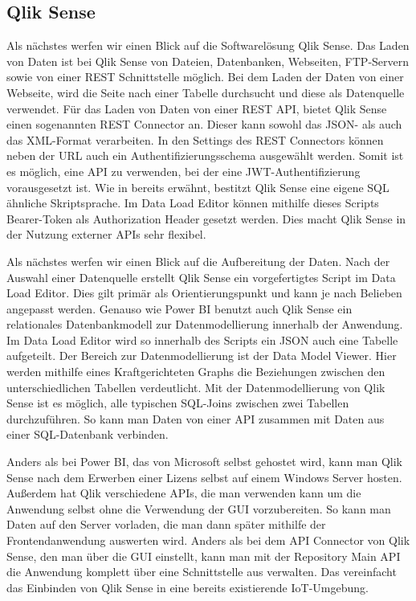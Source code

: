 \subsection{Qlik Sense}
\label{subsec:qliksense}
Als nächstes werfen wir einen Blick auf die Softwarelösung Qlik Sense.
Das Laden von Daten ist bei Qlik Sense von Dateien, Datenbanken, Webseiten, FTP-Servern sowie von einer
REST Schnittstelle möglich. Bei dem Laden der Daten von einer Webseite, wird die Seite nach einer Tabelle
durchsucht und diese als Datenquelle verwendet.\cite[S. 17]{QlikSenseCookbook} Für das Laden von Daten von
einer REST API, bietet Qlik Sense einen sogenannten REST Connector an. Dieser kann sowohl das JSON- als auch
das XML-Format verarbeiten. In den Settings des REST Connectors können neben der URL auch ein
Authentifizierungsschema ausgewählt werden.\cite[S. 23]{QlikSenseCookbook} Somit ist es möglich,
eine API zu verwenden, bei der eine JWT-Authentifizierung vorausgesetzt ist. Wie in 
bereits erwähnt, bestitzt Qlik Sense eine eigene SQL ähnliche Skriptsprache. Im Data Load Editor
können mithilfe dieses Scripts Bearer-Token als Authorization Header gesetzt werden. Dies macht Qlik
Sense in der Nutzung externer APIs sehr flexibel.

Als nächstes werfen wir einen Blick auf die Aufbereitung der Daten. Nach der Auswahl einer Datenquelle
erstellt Qlik Sense ein vorgefertigtes Script im Data Load Editor. Dies gilt primär als Orientierungspunkt
und kann je nach Belieben angepasst werden. Genauso wie Power BI benutzt auch Qlik Sense ein relationales
Datenbankmodell zur Datenmodellierung innerhalb der Anwendung. Im Data Load Editor wird so innerhalb des
Scripts ein JSON auch eine Tabelle aufgeteilt. Der Bereich zur Datenmodellierung ist der Data Model Viewer.
Hier werden mithilfe eines Kraftgerichteten Graphs die Beziehungen zwischen den unterschiedlichen
Tabellen verdeutlicht. Mit der Datenmodellierung von Qlik Sense ist es möglich, alle typischen SQL-Joins
zwischen zwei Tabellen durchzuführen. So kann man Daten von einer API zusammen mit Daten aus einer SQL-Datenbank
verbinden.  

Anders als bei Power BI, das von Microsoft selbst gehostet wird, kann man Qlik Sense nach dem Erwerben
einer Lizens selbst auf einem Windows Server hosten. Außerdem hat Qlik verschiedene APIs, die man
verwenden kann um die Anwendung selbst ohne die Verwendung der GUI vorzubereiten. So kann man Daten
auf den Server vorladen, die man dann später mithilfe der Frontendanwendung auswerten wird. Anders als bei
dem API Connector von Qlik Sense, den man über die GUI einstellt, kann man mit der Repository Main API
die Anwendung komplett über eine Schnittstelle aus verwalten.\cite{QlikSenseRepositoryMainAPI}
Das vereinfacht das Einbinden von Qlik Sense in eine bereits existierende IoT-Umgebung.

